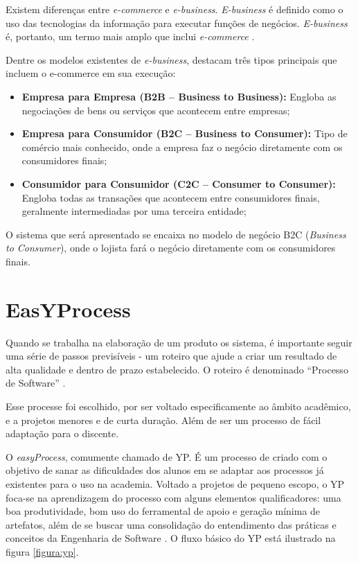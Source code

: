 \documentclass[a4paper,12pt]{monografia}
\begin{document}
Existem diferenças entre \textit{e-commerce} e \textit{e-business}. \textit{E-business} é definido como o uso das tecnologias da informação para executar funções de negócios. \textit{E-business} é, portanto, um termo mais amplo que inclui \textit{e-commerce} \cite{gordon}. 

Dentre os modelos existentes de \textit{e-business},  destacam três tipos principais que incluem o e-commerce em sua execução:

\begin{itemize}
\item \textbf{Empresa para Empresa (B2B – Business to Business):} Engloba as negociações de bens ou serviços que acontecem entre empresas;
\item \textbf{Empresa para Consumidor (B2C – Business to Consumer):} Tipo de comércio mais conhecido, onde a empresa faz o negócio diretamente com os consumidores finais;
\item \textbf{Consumidor para Consumidor (C2C – Consumer to Consumer):} Engloba todas as transações que acontecem entre consumidores finais, geralmente intermediadas por uma terceira entidade;
\end{itemize}

O sistema que será apresentado se encaixa no modelo de negócio B2C (\textit{Business to Consumer}), onde o lojista fará o negócio diretamente com os consumidores finais.

\section{EasYProcess} %
\label{sec:yp}

Quando se trabalha na elaboração de um produto os sistema, é importante seguir uma série de passos previsíveis - um roteiro que ajude a criar um resultado de alta qualidade e dentro de prazo estabelecido. O roteiro é denominado ``Processo de Software'' \cite{pressman}.

Esse processe foi escolhido, por ser voltado especificamente ao âmbito acadêmico, e a projetos menores e de curta duração. Além de ser um processo de fácil adaptação para o discente.

O \textit{easyProcess}, comumente chamado de YP. É um processo de  criado com o objetivo de sanar as dificuldades dos alunos em se adaptar aos processos já existentes para o uso na academia. Voltado a projetos de pequeno escopo, o YP foca-se na aprendizagem do processo com alguns elementos qualificadores: uma boa produtividade, bom uso do ferramental de apoio e geração mínima de artefatos, além de se buscar uma consolidação do entendimento das práticas e conceitos da Engenharia de Software \cite{easyprocess}. O fluxo básico do YP está ilustrado na figura \ref{figura:yp}.
\end{document}
